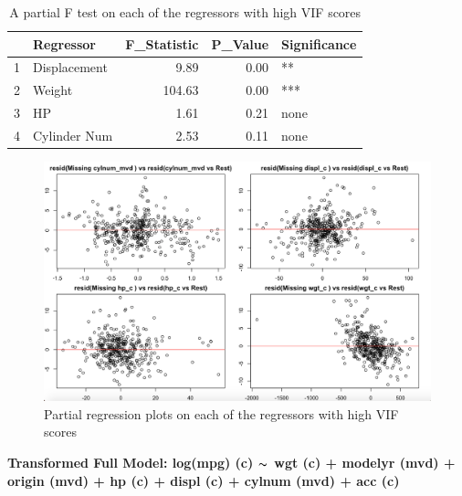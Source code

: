 \documentclass{article}
\newcommand{\mt}[1]{\ensuremath{#1}}
\newcommand{\tl}{\mt{\thicksim} }
\begin{document}
\clearpage
\newpage 

\begin{table}[ht]
\centering
\begin{tabular}{rlrrl}
  \hline
 & Regressor & F\_Statistic & P\_Value & Significance \\ 
  \hline
1 & Displacement & 9.89 & 0.00 & ** \\ 
  2 & Weight & 104.63 & 0.00 & *** \\ 
  3 & HP & 1.61 & 0.21 & none \\ 
  4 & Cylinder Num & 2.53 & 0.11 & none \\ 
   \hline
\end{tabular}
\caption{A partial F test on each of the regressors with high VIF scores}
\label{tab:partialfhighvif}
\end{table}

\begin{figure}
	\centering
	\includegraphics[width=1\linewidth]{11-14p_PrRgall4}
	\caption[Partial regression plots on high VIF regressors]
	{Partial regression plots on each of the regressors with high VIF scores}
\end{figure}

\clearpage
\newpage

\textbf{Transformed Full Model: log(mpg) (c) \tl wgt (c) + modelyr (mvd) + origin (mvd) + hp (c) + displ (c) + cylnum (mvd) + acc (c)}

\clearpage
\newpage 
\end{document}
